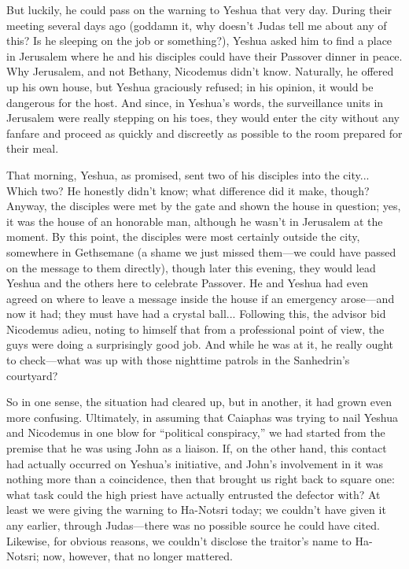 But luckily, he could pass on the warning to Yeshua that very day. During their meeting several days ago (goddamn it, why doesn't Judas tell me about any of this? Is he sleeping on the job or something?), Yeshua asked him to find a place in Jerusalem where he and his disciples could have their Passover dinner in peace. Why Jerusalem, and not Bethany, Nicodemus didn't know. Naturally, he offered up his own house, but Yeshua graciously refused; in his opinion, it would be dangerous for the host. And since, in Yeshua's words, the surveillance units in Jerusalem were really stepping on his toes, they would enter the city without any fanfare and proceed as quickly and discreetly as possible to the room prepared for their meal.

That morning, Yeshua, as promised, sent two of his disciples into the city... Which two? He honestly didn't know; what difference did it make, though? Anyway, the disciples were met by the gate and shown the house in question; yes, it was the house of an honorable man, although he wasn't in Jerusalem at the moment. By this point, the disciples were most certainly outside the city, somewhere in Gethsemane (a shame we just missed them---we could have passed on the message to them directly), though later this evening, they would lead Yeshua and the others here to celebrate Passover. He and Yeshua had even agreed on where to leave a message inside the house if an emergency arose---and now it had; they must have had a crystal ball... Following this, the advisor bid Nicodemus adieu, noting to himself that from a professional point of view, the guys were doing a surprisingly good job. And while he was at it, he really ought to check---what was up with those nighttime patrols in the Sanhedrin's courtyard?

So in one sense, the situation had cleared up, but in another, it had grown even more confusing. Ultimately, in assuming that Caiaphas was trying to nail Yeshua and Nicodemus in one blow for ``political conspiracy,'' we had started from the premise that he was using John as a liaison. If, on the other hand, this contact had actually occurred on Yeshua's initiative, and John's involvement in it was nothing more than a coincidence, then that brought us right back to square one: what task could the high priest have actually entrusted the defector with? At least we were giving the warning to Ha-Notsri today; we couldn't have given it any earlier, through Judas---there was no possible source he could have cited. Likewise, for obvious reasons, we couldn't disclose the traitor's name to Ha-Notsri; now, however, that no longer mattered.

